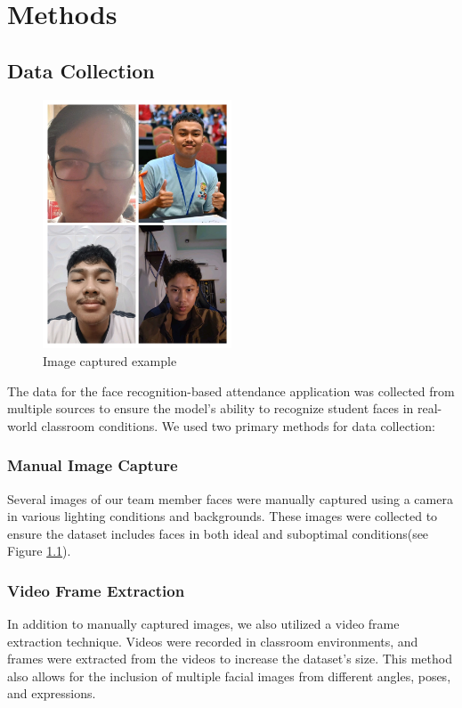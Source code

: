 \chapter{Methods}
\section{Data Collection}
\begin{figure}[h!]
    \centering
    \includegraphics[width=0.5\textwidth]{images/img_source_example.jpeg}
    \caption{Image captured example}
    \label{fig:ex_photo}
\end{figure}

The data for the face recognition-based attendance application was collected from multiple sources to ensure the model's ability to recognize student faces in real-world classroom conditions. We used two primary methods for data collection:
\subsection{Manual Image Capture}
Several images of our team member faces were manually captured using a camera in various lighting conditions and backgrounds. These images were collected to ensure the dataset includes faces in both ideal and suboptimal conditions(see Figure \ref{fig:ex_photo}).
\subsection{Video Frame Extraction}
In addition to manually captured images, we also utilized a video frame extraction technique. Videos were recorded in classroom environments, and frames were extracted from the videos to increase the dataset's size. This method also allows for the inclusion of multiple facial images from different angles, poses, and expressions.
